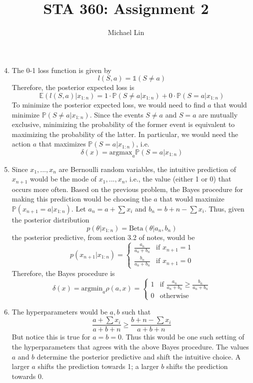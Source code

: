 \documentclass{article}
\title{STA 360: Assignment 2}
\author{Michael Lin}
\begin{document}
\maketitle

\begin{enumerate}
\setcounter{enumi}{3}
\item The 0-1 loss function is given by
$$ l(S,a) = \mathds{1}(S\neq a) $$
Therefore, the posterior expected loss is
$$ \mathds{E}(l(S,a)|x_{1:n}) = 1 \cdot \mathds{P}(S\neq a|x_{1:n}) + 0 \cdot \mathds{P}(S=a|x_{1:n}) $$
To minimize the posterior expected loss, we would need to find $a$ that would minimize $\mathds{P}(S\neq a|x_{1:n})$. Since the events $S\neq a$ and $S=a$ are mutually exclusive, minimizing the probability of the former event is equivalent to maximizing the probability of the latter. In particular, we would need the action $a$ that maximizes $\mathds{P}(S=a|x_{1:n})$, i.e.
$$ \delta(x) = \mathrm{argmax}_{a} \mathds{P}(S=a|x_{1:n}) $$

\item Since $x_1,...,x_n$ are Bernoulli random variables, the intuitive prediction of $x_{n+1}$ would be the mode of $x_1,...,x_n$, i.e., the value (either 1 or 0) that occurs more often.  Based on the previous problem, the Bayes procedure for making this prediction would be choosing the $a$ that would maximize $\mathds{P}(x_{n+1}=a|x_{1:n})$. Let $a_n=a+\sum x_i$ and $b_n=b+n-\sum x_i$. Thus, given the posterior distribution
$$p(\theta|x_{1:n})=\mathrm{Beta}(\theta|a_n, b_n)$$
the posterior predictive, from section 3.2 of notes, would be 
$$p(x_{n+1}|x_{1:n}) = \left\{
  \begin{array}{lr}
    \frac{a_n}{a_n+b_n} & \text{if } x_{n+1} = 1\\
    \frac{b_n}{a_n+b_n} & \text{if } x_{n+1} = 0
  \end{array}
\right.
$$
Therefore, the Bayes procedure is
$$\delta(x) = \mathrm{argmin}_a \rho(a,x) =\left\{
  \begin{array}{lr}
    1 & \text{if } \frac{a_n}{a_n+b_n}\geq \frac{b_n}{a_n+b_n}\\
    0 & \text{otherwise}
  \end{array}
\right.
$$

\item The hyperparameters would be $a,b$ such that
$$ \frac{a+\sum x_i}{a+b+n}\geq \frac{b+n-\sum x_i}{a+b+n} $$
But notice this is true for $a=b=0$. Thus this would be one such setting of the hyperparameters that agrees with the above Bayes procedure. The values $a$ and $b$ determine the posterior predictive and shift the intuitive choice. A larger $a$ shifts the prediction towards 1; a larger $b$ shifts the prediction towards 0.


\end{enumerate}
\end{document}
